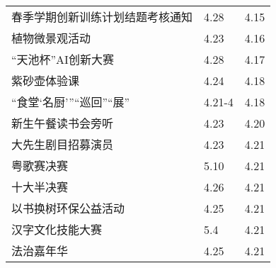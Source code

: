 \documentclass[letterpaper, 12pt]{article}
\begin{document}
\begin{multicols}{2}
{\begin{longtable}{|>{\centering\arraybackslash}m{}|m{}|m{}|}
    春季学期创新训练计划结题考核通知 & 4.28 & 4.15\\
    植物微景观活动 & 4.23 & 4.16\\
    “天池杯”AI创新大赛 & 4.28 & 4.17\\
    紫砂壶体验课 & 4.24 & 4.18\\
    “食堂‘名厨’”“巡回”“展” & 4.21-4 & 4.18\\
    新生午餐读书会旁听 & 4.23 & 4.20\\
    大先生剧目招募演员 & 4.23 & 4.21\\
    粤歌赛决赛 & 5.10 & 4.21\\
    十大半决赛 & 4.26 & 4.21\\
    以书换树环保公益活动 & 4.25 & 4.21\\
    汉字文化技能大赛 & 5.4 & 4.21\\ 
    法治嘉年华 & 4.25 & 4.21\\
    \hline
\end{longtable}
\unskip
\unpenalty
\unpenalty}\unvbox\colbbox
\end{multicols}
\end{document}
